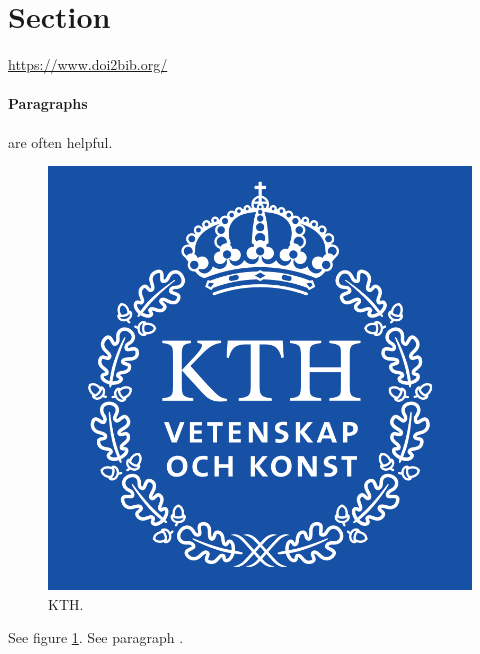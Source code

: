 \section{Section}

\cite{incollection}
\cite{url}

\href{https://www.doi2bib.org/}{https://www.doi2bib.org/}

\paragraph{Paragraphs}\label{para:paragraph} are often helpful.

\begin{figure}[h]
    \begin{center}
        \includegraphics[scale=0.2]{figures/kth.png}
    \end{center}
    \caption{KTH.}
    \label{fig:kth}
\end{figure}

See figure \ref{fig:kth}.
See paragraph .


\lipsum[1-7]